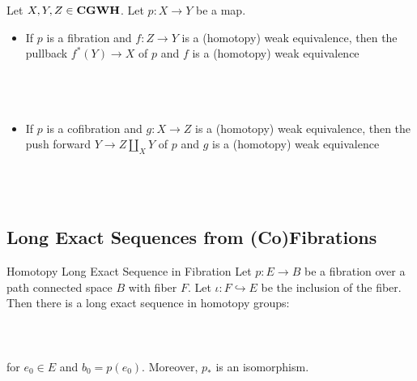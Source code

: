 \documentclass[a4paper]{article}
\begin{document}
\begin{prp}{}{} Let $X,Y,Z\in\bold{CGWH}$. Let $p:X\to Y$ be a map. 
\begin{itemize}
\item If $p$ is a fibration and $f:Z\to Y$ is a (homotopy) weak equivalence, then the pullback $f^\ast(Y)\to X$ of $p$ and $f$ is a (homotopy) weak equivalence \\~\\
\\~\\
\item If $p$ is a cofibration and $g:X\to Z$ is a (homotopy) weak equivalence, then the push forward $Y\to Z\coprod_XY$ of $p$ and $g$ is a (homotopy) weak equivalence \\~\\
\\~\\
\end{itemize}
\end{prp}

\subsection{Long Exact Sequences from (Co)Fibrations}
\begin{thm}{Homotopy Long Exact Sequence in Fibration}{} Let $p:E\to B$ be a fibration over a path connected space $B$ with fiber $F$. Let $\iota:F\hookrightarrow E$ be the inclusion of the fiber. Then there is a long exact sequence in homotopy groups: \\~\\
\\~\\
for $e_0\in E$ and $b_0=p(e_0)$. Moreover, $p_\ast$ is an isomorphism. 
\end{thm}
\end{document}
